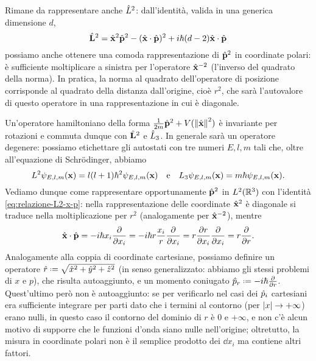 Rimane da rappresentare anche $\hat{L}^2$: dall'identità, valida in una generica dimensione $d$,
\begin{equation}
	\hat{\mathbf{L}}^2=\hat{\mathbf{x}}^2\hat{\mathbf{p}}^2-({\hat{\mathbf{x}}}\cdot{\hat{\mathbf{p}}})^2+i\hbar(d-2){\hat{\mathbf{x}}}\cdot{\hat{\mathbf{p}}}
	\label{eq:relazione-L2-x-p}
\end{equation}
possiamo anche ottenere una comoda rappresentazione di $\hat{\mathbf{p}}^2$ in coordinate polari: è sufficiente moltiplicare a sinistra per l'operatore $\hat{\mathbf{x}}^{-2}$ (l'inverso del quadrato della norma).
In pratica, la norma al quadrato dell'operatore di posizione corrisponde al quadrato della distanza dall'origine, cioè $r^2$, che sarà l'autovalore di questo operatore in una rappresentazione in cui è diagonale.

Un'operatore hamiltoniano della forma $\frac1{2m}\hat{\mathbf{p}}^2+V(\left\|{\hat{\mathbf{x}}}\right\|^2)$ è invariante per rotazioni e commuta dunque con $\hat{\mathbf{L}}^2$ e $\hat{L}_3$.
In generale sarà un operatore degenere: possiamo etichettare gli autostati con tre numeri $E,l,m$ tali che, oltre all'equazione di Schr\"odinger, abbiamo
\begin{equation}
	L^2\psi_{E,l,m}(\mathbf{x})=l(l+1)\hbar^2\psi_{E,l,m}(\mathbf{x})\quad\text{e}\quad L_3\psi_{E,l,m}(\mathbf{x})=m\hbar\psi_{E,l,m}(\mathbf{x}).
	\label{eq:autofunzioni-momento-angolare}
\end{equation}
Vediamo dunque come rappresentare opportunamente $\hat{\mathbf{p}}^2$ in $L^2(\mathbb{R}^3)$ con l'identità \eqref{eq:relazione-L2-x-p}: nella rappresentazione delle coordinate $\hat{\mathbf{x}}^2$ è diagonale si traduce nella moltiplicazione per $r^2$ (analogamente per $\hat{\mathbf{x}}^{-2}$), mentre
\begin{equation}
	{\hat{\mathbf{x}}}\cdot{\hat{\mathbf{p}}}=-i\hbar x_i\frac{\partial {}}{\partial {x_i}}=-i\hbar r\frac{x_i}{r}\frac{\partial {}}{\partial {x_i}}=r\frac{\partial {r}}{\partial {x_i}}\frac{\partial {}}{\partial {x_i}}=r\frac{\partial {}}{\partial {r}}.
\end{equation}
Analogamente alla coppia di coordinate cartesiane, possiamo definire un operatore $\op r\defeq\sqrt{\op x^2+\op y^2+\op z^2}$ (in senso generalizzato: abbiamo gli stessi problemi di $x$ e $p$), che risulta autoaggiunto, e un momento coniugato $\op p_r\defeq-i\hbar\drp{}{r}$.
Quest'ultimo però non è autoaggiunto: se per verificarlo nel casi dei $\hat{p}_i$ cartesiani era sufficiente integrare per parti dato che i termini al contorno (per $\left|{x}\right|\to+\infty$) erano nulli, in questo caso il contorno del dominio di $r$ è $0$ e $+\infty$, e non c'è alcun motivo di supporre che le funzioni d'onda siano nulle nell'origine; oltretutto, la misura in coordinate polari non è il semplice prodotto dei $\dd x_i$ ma contiene altri fattori.
